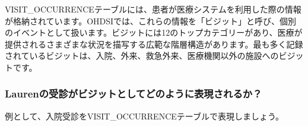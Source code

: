\documentclass[
  11pt]{book}
\theoremstyle{definition}
\theoremstyle{definition}
\theoremstyle{definition}
\theoremstyle{definition}
\theoremstyle{remark}
\begin{document}
VISIT\_OCCURRENCEテーブルには、患者が医療システムを利用した際の情報が格納されています。OHDSIでは、これらの情報を「ビジット」と呼び、個別のイベントとして扱います。ビジットには12のトップカテゴリーがあり、医療が提供されるさまざまな状況を描写する広範な階層構造があります。最も多く記録されているビジットは、入院、外来、救急外来、医療機関以外の施設へのビジットです。

\subsubsection*{Laurenの受診がビジットとしてどのように表現されるか？}\label{laurenux306eux53d7ux8a3aux304cux30d3ux30b8ux30c3ux30c8ux3068ux3057ux3066ux3069ux306eux3088ux3046ux306bux8868ux73feux3055ux308cux308bux304b}

例として、入院受診をVISIT\_OCCURRENCEテーブルで表現しましょう。
\end{document}

